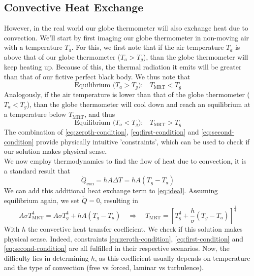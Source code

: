 \documentclass[]{scrartcl}
\begin{document}
\subsection{Convective Heat Exchange}
However, in the real world our globe thermometer will also exchange heat due to convection. We'll start by first imaging our globe thermometer in non-moving air with a temperature $T_a$. For this, we first note that if the air temperature $T_a$ is above that of our globe thermometer ($T_a > T_{g}$), than the globe thermometer will keep heating up. Because of this, the thermal radiation it emits will be greater than that of our fictive perfect black body. We thus note that
\begin{equation}\label{eq:first-condition}
	\text{Equilibrium ($T_a > T_g$):}\quad T_\text{MRT} < T_g
\end{equation}
Analogously, if the air temperature is lower than that of the globe thermometer ($T_a < T_g$), than the globe thermometer will cool down and reach an equilibrium at a temperature below $T_{\text{MRT}}$, and thus
\begin{equation}\label{eq:second-condition}
	\text{Equilibrium ($T_a < T_g$):}\quad T_\text{MRT} > T_g
\end{equation}
The combination of \eqref{eq:zeroth-condition}, \eqref{eq:first-condition} and \eqref{eq:second-condition} provide physically intuitive 'constraints', which can be used to check if our solution makes physical sense.
\\

We now employ thermodynamics to find the flow of heat due to convection, it is a standard result that
\begin{equation}
	\dot{Q}_\text{con} = hA\Delta T = hA\left(T_g - T_a\right)
\end{equation}
We can add this additional heat exchange term to \eqref{eq:ideal}. Assuming equilibrium again, we set $\dot{Q} = 0$, resulting in
\begin{equation}\label{eq:final-black}
	\boxed{A\sigma T^4_{\text{MRT}} = A\sigma T^4_g + hA\left(T_g - T_a\right) \quad \Longrightarrow \quad T_{\text{MRT}} = \left[T_g^4 + \frac{h}{\sigma}\left(T_g - T_a\right)\right]^{\frac{1}{4}}}
\end{equation}
With $h$ the convective heat transfer coefficient. We check if this solution makes physical sense. Indeed, constraints \eqref{eq:zeroth-condition}, \eqref{eq:first-condition} and \eqref{eq:second-condition} are all fulfilled in their respective scenarios. Now, the difficulty lies in determining $h$, as this coefficient usually depends on temperature and the type of convection (free vs forced, laminar vs turbulence).
\end{document}
